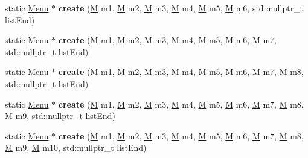 \begin{DoxyCompactItemize}
\mbox{\label{classMenu_a2b5615782fc5cd26bfab6e123d3000a8}} 
static \hyperlink{classMenu}{Menu} $\ast$ {\bfseries create} (\hyperlink{classMenuItem}{M} m1, \hyperlink{classMenuItem}{M} m2, \hyperlink{classMenuItem}{M} m3, \hyperlink{classMenuItem}{M} m4, \hyperlink{classMenuItem}{M} m5, \hyperlink{classMenuItem}{M} m6, std\+::nullptr\+\_\+t list\+End)
\item 
\mbox{\label{classMenu_ad4c695a4cff8bd40f6a243d5e90cc3ea}} 
static \hyperlink{classMenu}{Menu} $\ast$ {\bfseries create} (\hyperlink{classMenuItem}{M} m1, \hyperlink{classMenuItem}{M} m2, \hyperlink{classMenuItem}{M} m3, \hyperlink{classMenuItem}{M} m4, \hyperlink{classMenuItem}{M} m5, \hyperlink{classMenuItem}{M} m6, \hyperlink{classMenuItem}{M} m7, std\+::nullptr\+\_\+t list\+End)
\item 
\mbox{\label{classMenu_abf10719e2d7075c0a77630c4cfec9d47}} 
static \hyperlink{classMenu}{Menu} $\ast$ {\bfseries create} (\hyperlink{classMenuItem}{M} m1, \hyperlink{classMenuItem}{M} m2, \hyperlink{classMenuItem}{M} m3, \hyperlink{classMenuItem}{M} m4, \hyperlink{classMenuItem}{M} m5, \hyperlink{classMenuItem}{M} m6, \hyperlink{classMenuItem}{M} m7, \hyperlink{classMenuItem}{M} m8, std\+::nullptr\+\_\+t list\+End)
\item 
\mbox{\label{classMenu_a8dbe763ae7c7871e11eb612b2d92b086}} 
static \hyperlink{classMenu}{Menu} $\ast$ {\bfseries create} (\hyperlink{classMenuItem}{M} m1, \hyperlink{classMenuItem}{M} m2, \hyperlink{classMenuItem}{M} m3, \hyperlink{classMenuItem}{M} m4, \hyperlink{classMenuItem}{M} m5, \hyperlink{classMenuItem}{M} m6, \hyperlink{classMenuItem}{M} m7, \hyperlink{classMenuItem}{M} m8, \hyperlink{classMenuItem}{M} m9, std\+::nullptr\+\_\+t list\+End)
\item 
\mbox{\label{classMenu_ac0f4ff6590fdce3bfc2d40f34d286e12}} 
static \hyperlink{classMenu}{Menu} $\ast$ {\bfseries create} (\hyperlink{classMenuItem}{M} m1, \hyperlink{classMenuItem}{M} m2, \hyperlink{classMenuItem}{M} m3, \hyperlink{classMenuItem}{M} m4, \hyperlink{classMenuItem}{M} m5, \hyperlink{classMenuItem}{M} m6, \hyperlink{classMenuItem}{M} m7, \hyperlink{classMenuItem}{M} m8, \hyperlink{classMenuItem}{M} m9, \hyperlink{classMenuItem}{M} m10, std\+::nullptr\+\_\+t list\+End)
\item 

\end{DoxyCompactItemize}
